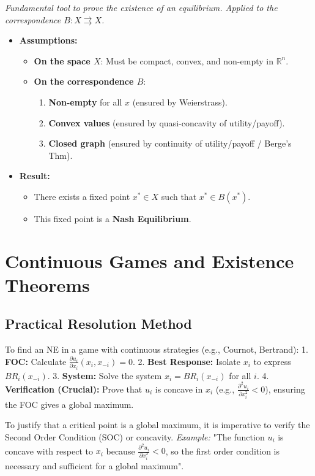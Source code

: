 \documentclass[10pt,a4paper]{article}
\begin{document}
\begin{tcolorbox}[colback=white, title=\textbf{2. Kakutani Fixed Point Theorem}]
\textit{Fundamental tool to prove the existence of an equilibrium. Applied to the correspondence $B : X \rightrightarrows X$.}
\begin{itemize}
    \item \textbf{Assumptions:}
    \begin{itemize}
        \item \textbf{On the space $X$}: Must be compact, convex, and non-empty in $\mathbb{R}^n$.
        \item \textbf{On the correspondence $B$}:
        \begin{enumerate}
            \item \textbf{Non-empty} for all $x$ (ensured by Weierstrass).
            \item \textbf{Convex values} (ensured by quasi-concavity of utility/payoff).
            \item \textbf{Closed graph} (ensured by continuity of utility/payoff / Berge's Thm).
        \end{enumerate}
    \end{itemize}
    \item \textbf{Result:}
    \begin{itemize}
        \item There exists a fixed point $x^* \in X$ such that $x^* \in B(x^*)$.
        \item This fixed point is a \textbf{Nash Equilibrium}.
    \end{itemize}
\end{itemize}
\end{tcolorbox}

\section{Continuous Games and Existence Theorems}

\subsection{Practical Resolution Method}
To find an NE in a game with continuous strategies (e.g., Cournot, Bertrand):
1. \textbf{FOC:} Calculate $\frac{\partial u_i}{\partial x_i}(x_i, x_{-i}) = 0$.
2. \textbf{Best Response:} Isolate $x_i$ to express $BR_i(x_{-i})$.
3. \textbf{System:} Solve the system $x_i = BR_i(x_{-i})$ for all $i$.
4. \textbf{Verification (Crucial):} Prove that $u_i$ is concave in $x_i$ (e.g., $\frac{\partial^2 u_i}{\partial x_i^2} < 0$), ensuring the FOC gives a global maximum.
\begin{tcolorbox}[colback=yellow!10, title=FOC/SOC Rigor]
To justify that a critical point is a global maximum, it is imperative to verify the Second Order Condition (SOC) or concavity.
\textit{Example:} "The function $u_i$ is concave with respect to $x_i$ because $\frac{\partial^2 u_i}{\partial x_i^2} < 0$, so the first order condition is necessary and sufficient for a global maximum".
\end{tcolorbox}
\end{document}
